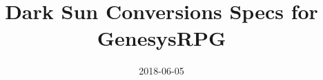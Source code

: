 \documentclass[a4paper, openright, 8pt]{report}
\title{Dark Sun Conversions Specs for GenesysRPG}
\date{2018-06-05}
\begin{document}
\renewcommand{\constRacesShowImage}{false}
\renewcommand{\constReferItemQualities}{false}




\arcanaTree

\archerTree

\gladiatorTree

\thiefTree
\end{document}
